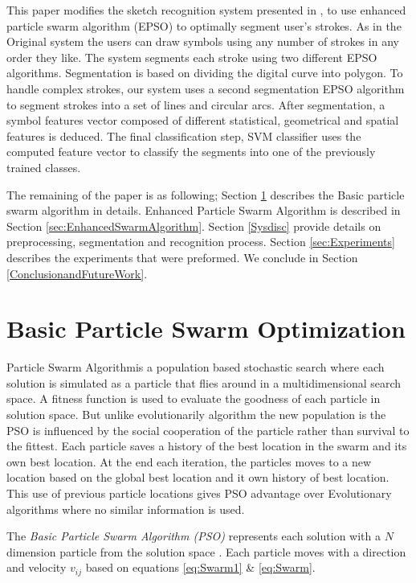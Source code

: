 \documentclass[10pt]{article}
\begin{document}
This paper modifies the sketch recognition system presented in \cite{mypaper}, to use enhanced particle swarm algorithm (EPSO) to optimally segment user's strokes. As in the Original system the users can draw symbols using any number of strokes in any order they like. The system segments each stroke using two different EPSO algorithms. Segmentation is based on dividing the digital curve into polygon\cite{PolygonApproximationPSO}. To handle complex strokes, our system uses a second segmentation EPSO algorithm to segment strokes into a set of lines and circular arcs. After segmentation, a symbol features vector composed of different statistical, geometrical and spatial features is deduced. The final classification step, SVM classifier uses the computed feature vector to classify the segments into one of the previously trained classes. 

The remaining of the paper is as following; Section \ref{sec:ParticleSwarmAlgorithm} describes the Basic particle swarm algorithm in details.  Enhanced Particle Swarm Algorithm is described in Section \ref{sec:EnhancedSwarmAlgorithm}. Section \ref{Sysdisc} provide details on preprocessing, segmentation and recognition process. Section \ref{sec:Experiments} describes the experiments that were preformed. We conclude in Section \ref{ConclusionandFutureWork}.
 

\section{Basic Particle Swarm Optimization}
\label{sec:ParticleSwarmAlgorithm}

 Particle Swarm Algorithm\cite{PSOFirst}is a population based stochastic search where each solution is simulated as a  particle that flies around in a multidimensional search space. A fitness function is used to evaluate the goodness of each particle in solution space. But unlike evolutionarily algorithm the new population is the PSO is influenced by the social cooperation of the particle rather than survival to the fittest. Each particle saves a history of the best location in the swarm and its own best location.  At the end each iteration, the particles moves to a new location based on the global best location and it own history of best location. This use of previous particle locations gives PSO advantage over Evolutionary algorithms where no similar information is used.

 The \textit{Basic Particle Swarm Algorithm (PSO)} represents each solution with a $N$ dimension particle from the solution space \cite{PSOFirst}. Each particle moves with a direction and velocity $v_{ij}$ based on equations \ref{eq:Swarm1} \& \ref{eq:Swarm}.
\end{document}
